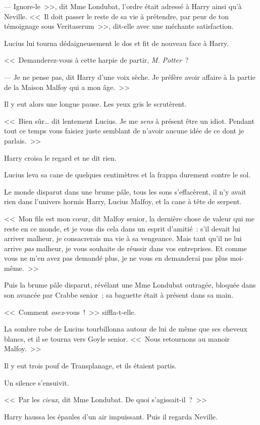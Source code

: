 --- Ignore-le~>>, dit Mme Londubat, l'ordre était adressé à Harry ainsi qu'à Neville. <<~Il doit passer le reste de sa vie à prétendre, par peur de ton témoignage sous Veritaserum~>>, dit-elle avec une méchante satisfaction.

Lucius lui tourna dédaigneusement le dos et fit de nouveau face à Harry.

<<~Demanderez-vous à cette harpie de partir, \emph{M. Potter}~?

--- Je ne pense pas, dit Harry d'une voix sèche. Je préfère avoir affaire à la partie de la Maison Malfoy qui a mon âge.~>>

Il y eut alors une longue pause. Les yeux gris le scrutèrent.

<<~Bien sûr… dit lentement Lucius. Je me \emph{sens} à présent être un idiot. Pendant tout ce temps vous faisiez juste semblant de n'avoir aucune idée de ce dont je parlais.~>>

Harry croisa le regard et ne dit rien.

Lucius leva sa cane de quelques centimètres et la frappa durement contre le sol.

Le monde disparut dans une brume pâle, tous les sons s'effacèrent, il n'y avait rien dans l'univers hormis Harry, Lucius Malfoy, et la cane à tête de serpent.

<<~Mon fils est mon cœur, dit Malfoy senior, la dernière chose de valeur qui me reste en ce monde, et je vous dis cela dans un esprit d'amitié~: s'il devait lui arriver malheur, je consacrerais ma vie à sa vengeance. Mais tant qu'il ne lui arrive \emph{pas} malheur, je vous souhaite de réussir dans vos entreprises. Et comme vous ne m'en avez pas demandé plus, je ne vous en demanderai pas plus moi-même.~>>

Puis la brume pâle disparut, révélant une Mme Londubat outragée, bloquée dans son avancée par Crabbe senior~; sa baguette était à présent dans sa main.

<<~Comment \emph{osez}-vous~!~>> siffla-t-elle.

La sombre robe de Lucius tourbillonna autour de lui de même que ses cheveux blancs, et il se tourna vers Goyle senior. <<~Nous retournons au manoir Malfoy.~>>

Il y eut trois pouf de Transplanage, et ils étaient partis.

Un silence s'ensuivit.

<<~Par les \emph{cieux}, dit Mme Londubat. De quoi s'agissait-il~?~>>

Harry haussa les épaules d'un air impuissant. Puis il regarda Neville.

